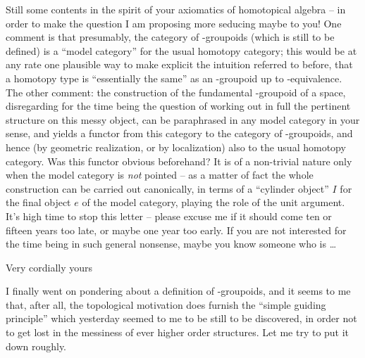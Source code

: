 Still some contents in the spirit of your axiomatics of homotopical
algebra -- in order to make the question I am proposing more seducing
maybe to you! One comment is that presumably, the category of
\oo-groupoids (which is still to be defined) is a ``model category''
for the usual homotopy category; this would be at any rate one
plausible way to make explicit the intuition referred to before, that
a homotopy type is ``essentially the same'' as an \oo-groupoid up to
\oo-equivalence. The other comment: the construction of the
fundamental \oo-groupoid of a space, disregarding for the time being
the question of working out in full the pertinent structure on this
messy object, can be paraphrased in any model category in your sense,
and yields a functor from this category to the category of
\oo-groupoids, and hence (by geometric realization, or by
localization) also to the usual homotopy category. Was this functor
obvious beforehand? It is of a non-trivial nature only when the model
category is \emph{not} pointed -- as a matter of fact the whole
construction can be carried out canonically, in terms of a ``cylinder
object'' $I$ for the final object $e$ of the model category, playing
the role of the unit argument.
It's high time to stop this letter -- please excuse me if it should
come ten or fifteen years too late, or maybe one year too early. If
you are not interested for the time being in such general nonsense,
maybe you know someone who is \ldots

\bigskip

Very cordially yours

\bigbreak

\noindent\hfill{}\par

I finally went on pondering about a definition of
\oo-groupoids, and it seems to me that, after all, the topological
motivation does furnish the ``simple guiding principle'' which
yesterday seemed to me to be still to be discovered, in order not to
get lost in the messiness of ever higher order structures. Let me try
to put it down roughly.

